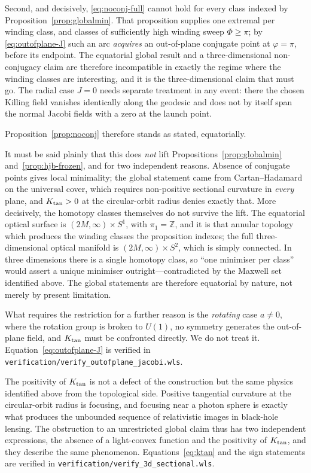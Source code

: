 \documentclass[12pt]{iopart}
\theoremstyle{plain}
\theoremstyle{definition}
\theoremstyle{remark}
\begin{document}
Second, and decisively, \eqref{eq:noconj-full} cannot hold for every class indexed
by Proposition~\ref{prop:globalmin}. That proposition supplies one extremal per
winding class, and classes of sufficiently high winding sweep $\Phi\ge\pi$; by
\eqref{eq:outofplane-J} such an arc \emph{acquires} an out-of-plane conjugate point
at $\varphi=\pi$, before its endpoint. The equatorial global result and a
three-dimensional non-conjugacy claim are therefore incompatible in exactly the
regime where the winding classes are interesting, and it is the three-dimensional
claim that must go. The radial case $J=0$ needs separate treatment in any event:
there the chosen Killing field vanishes identically along the geodesic and does not
by itself span the normal Jacobi fields with a zero at the launch point.

Proposition~\ref{prop:noconj} therefore stands as stated, equatorially.

It must be said plainly that this does \emph{not} lift
Propositions~\ref{prop:globalmin} and~\ref{prop:hjb-frozen}, and for two
independent reasons. Absence of conjugate points gives local minimality; the global
statement came from Cartan--Hadamard on the universal cover, which requires
non-positive sectional curvature in \emph{every} plane, and $K_{\rm tan}>0$ at the
circular-orbit radius denies exactly that. More decisively, the homotopy classes
themselves do not survive the lift. The equatorial optical surface is
$(2M,\infty)\times S^1$, with $\pi_1=\mathbb{Z}$, and it is that annular topology
which produces the winding classes the proposition indexes; the full
three-dimensional optical manifold is $(2M,\infty)\times S^2$, which is simply
connected. In three dimensions there is a single homotopy class, so ``one minimiser
per class'' would assert a unique minimiser outright---contradicted by the Maxwell
set identified above. The global statements are therefore equatorial by nature, not
merely by present limitation.

What requires the restriction for a further reason is the \emph{rotating} case
$a\neq0$, where the rotation group is broken to $U(1)$, no symmetry generates the
out-of-plane field, and $K_{\rm tan}$ must be confronted directly. We do not treat
it.
Equation~\eqref{eq:outofplane-J} is verified in
\texttt{verification/verify\_outofplane\_jacobi.wls}.

The positivity of $K_{\rm tan}$ is not a defect of the construction but the same
physics identified above from the topological side. Positive tangential curvature at the circular-orbit
radius is focusing, and focusing near a photon sphere is exactly what produces
the unbounded sequence of relativistic images in black-hole lensing. The
obstruction to an unrestricted global claim thus has two independent expressions,
the absence of a light-convex function and the positivity of $K_{\rm tan}$, and
they describe the same phenomenon. Equations~\eqref{eq:ktan} and the sign
statements are verified in \texttt{verification/verify\_3d\_sectional.wls}.
\end{document}
